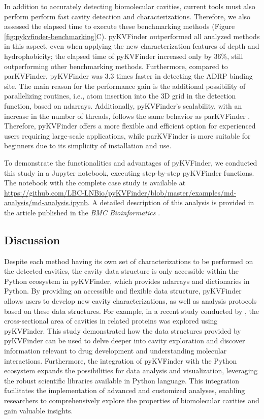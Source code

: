 \documentclass[Ingles]{phdthesis}
\def\ie{i.e.\onedot}
\begin{document}
In addition to accurately detecting biomolecular cavities, current tools must also perform perform fast cavity detection and characterizations. Therefore, we also assessed the elapsed time to execute these benchmarking methods (Figure \ref{fig:pykvfinder-benchmarking}C). pyKVFinder outperformed all analyzed methods in this aspect, even when applying the new characterization features of depth and hydrophobicity; the elapsed time of pyKVFinder increased only by 36\%, still outperforming other benchmarking methods. Furthermore, compared to parKVFinder, pyKVFinder was 3.3 times faster in detecting the ADRP binding site. The main reason for the performance gain is the additional possibility of parallelizing routines, \ie, atom insertion into the 3D grid in the detection function, based on ndarrays. Additionally, pyKVFinder's scalability, with an increase in the number of threads, follows the same behavior as parKVFinder \cite{guerra2020}. Therefore, pyKVFinder offers a more flexible and efficient option for experienced users requiring large-scale applications, while parKVFinder is more suitable for beginners due to its simplicity of installation and use.

To demonstrate the functionalities and advantages of pyKVFinder, we conducted this study in a Jupyter notebook, executing step-by-step pyKVFinder functions. The notebook with the complete case study is available at \url{https://github.com/LBC-LNBio/pyKVFinder/blob/master/examples/md-analysis/md-analysis.ipynb}. A detailed description of this analysis is provided in the article published in the \textit{BMC Bioinformatics} \cite{guerra2021}.

\subsection{Discussion}

Despite each method having its own set of characterizations to be performed on the detected cavities, the cavity data structure is only accessible within the Python ecosystem in pyKVFinder, which provides \acp{ndarray} and dictionaries in Python. By providing an accessible and flexible data structure, pyKVFinder allows users to develop new cavity characterizations, as well as analysis protocols based on these data structures. For example, in a recent study conducted by \cite{jefferson2023}, the cross-sectional area of cavities in related proteins was explored using pyKVFinder. This study demonstrated how the data structures provided by pyKVFinder can be used to delve deeper into cavity exploration and discover information relevant to drug development and understanding molecular interactions. Furthermore, the integration of pyKVFinder with the Python ecosystem expands the possibilities for data analysis and visualization, leveraging the robust scientific libraries available in Python language. This integration facilitates the implementation of advanced and customized analyses, enabling researchers to comprehensively explore the properties of biomolecular cavities and gain valuable insights.
\end{document}
